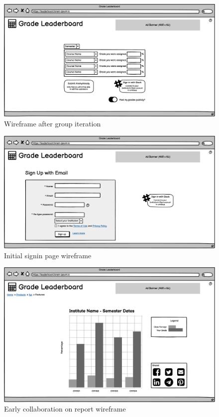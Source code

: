 \begin{figure}
    \centering
    \includegraphics[width=\textwidth]{images/Initial Page v07.png}
    \caption{Wireframe after group iteration}
    \label{fig:modifiedwireframe}
\end{figure}
\begin{figure}
    \centering
    \includegraphics[width=\textwidth]{images/Sign in Page v07.png}
    \caption{Initial signin page wireframe}
    \label{fig:signinwireframe}
\end{figure}
\begin{figure}
    \centering
    \includegraphics[width=\textwidth]{images/Full semester - class averages chart 1 v07.png}
    \caption{Early collaboration on report wireframe}
    \label{fig:earlyreportwireframe}
\end{figure}
